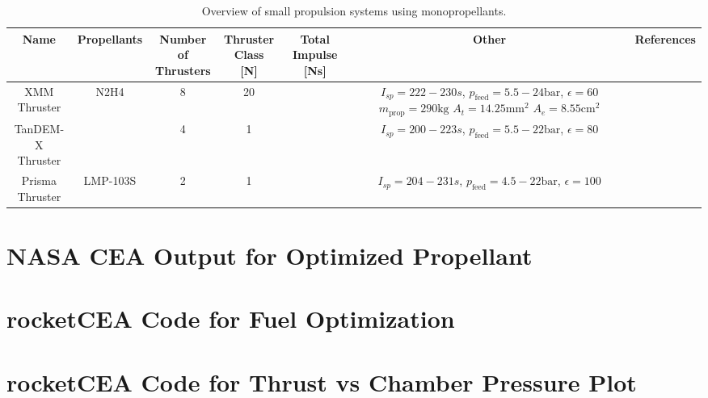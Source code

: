 \documentclass[12pt]{article}
\begin{document}
\newpage
\begin{sidewaystable}[]
	\centering
	\caption{Overview of small propulsion systems using monopropellants.}
	\begin{tabular}{|c|c|c|c|c|c|c|}
		\hline
		Name & Propellants & \makecell{Number of\\Thrusters} & \makecell{Thruster\\Class {[}N{]}} & \makecell{Total\\Impulse [Ns]} & Other & References\\ \hline
		
		\makecell{XMM\\Thruster} & N2H4 & 8 & 20 & \makecell{$>517000$}  & \makecell{$I_{sp}=222-230s$,\\$p_{\text{feed}}=5.5-24\text{bar}$,\\$\epsilon=60$\\$m_{\text{prop}}=290\text{kg}$\\$A_t=14.25\text{mm}^2$\\$A_e=8.55\text{cm}^2$} & \makecell{ \cite{EsaXMM} \cite{ariane20N}} \\ \hline
		
		\makecell{TanDEM-X\\Thruster} & \makecell{N2H4} & 4 & 1 & \makecell{$>135000$}& \makecell{$I_{sp}=200-223s$,\\$p_{\text{feed}}=5.5-22\text{bar}$,\\$\epsilon=80$} & \makecell{\cite{tandemX} \cite{ariane1N}}\\ \hline
		
		\makecell{Prisma\\Thruster}& LMP-103S & 2 & 1 & \makecell{$\approx 108773$} & \makecell{$I_{sp}=204-231s$,\\$p_{\text{feed}}=4.5-22\text{bar}$,\\$\epsilon=100$} & \cite{hpgpThruster} \\ \hline
	\end{tabular}
	\label{tab:reference}
\end{sidewaystable}
\clearpage 

\newpage
\begin{appendices}

\section{NASA CEA Output for Optimized Propellant}
\label{chap:cea_output}


\section{rocketCEA Code for Fuel Optimization}
\label{chap:code_b3}


\section{rocketCEA Code for Thrust vs Chamber Pressure Plot}
\label{chap:code_b5}


\end{appendices}


\newpage
\printbibliography 
 
\end{document}
